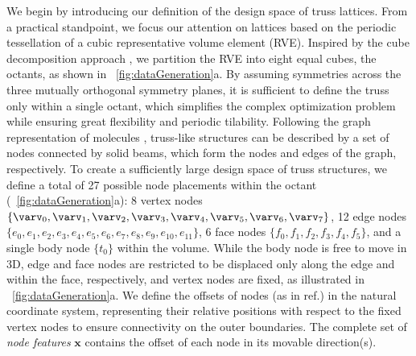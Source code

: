 \documentclass[fleqn,10pt]{wlscirep}
\newcommand{\boldface}[1]{\boldsymbol{#1}}
\newcommand{\bfx}{\boldface{x}}
\begin{document}
We begin by introducing our definition of the design space of truss lattices. From a practical standpoint, we focus our attention on lattices based on the periodic tessellation of a cubic representative volume element (RVE). Inspired by the cube decomposition approach \cite{panetta2015elastic}, we partition the RVE into eight equal cubes, the octants, as shown in \figureautorefname~\ref{fig:dataGeneration}a. By assuming symmetries across the three mutually orthogonal symmetry planes, it is sufficient to define the truss only within a single octant, which simplifies the complex optimization problem while ensuring great flexibility and periodic tilability.
Following the graph representation of molecules \cite{duvenaud2015convolutional, ross2021using}, truss-like structures can be described by a set of nodes connected by solid beams, which form the nodes and edges of the graph, respectively. To create a sufficiently large design space of truss structures, we define a total of 27 possible node placements within the octant (\figureautorefname~\ref{fig:dataGeneration}a): 8 vertex nodes $\{\varv_0,\varv_1,\varv_2,\varv_3,\varv_4,\varv_5,\varv_6,\varv_7\}$, 12 edge nodes $\{e_0,e_1,e_2,e_3,e_4,e_5,e_6,e_7,e_8,e_9,e_{10},e_{11}\}$, 6 face nodes $\{f_0,f_1,f_2,f_3,f_4,f_5\}$, and a single body node $\{t_0\}$ within the volume.
While the body node is free to move in 3D, edge and face nodes are restricted to be displaced only along the edge and within the face, respectively, and vertex nodes are fixed, as illustrated in \figureautorefname ~\ref{fig:dataGeneration}a. We define the offsets of nodes (as in ref.\cite{panetta2015elastic}) in the natural coordinate system, representing their relative positions with respect to the fixed vertex nodes to ensure connectivity on the outer boundaries. The complete set of \textit{node features} $\bfx$ contains the offset of each node in its movable direction(s). 
\end{document}
